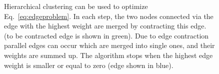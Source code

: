 \begin{center}
\begin{figure}
\begin{center}
{\begin{tikzpicture}
    \end{tikzpicture}


}
\caption{
    Hierarchical clustering can be used to optimize
    Eq.~\ref{eq:edgeproblem}.
    In each step, the two nodes connected via the edge with 
    the highest weight are merged by contracting this edge.
    (to be contracted edge is shown in green).
    Due to edge contraction parallel edges can occur which 
    are merged into single ones, and their weights are summed up.
    The algorithm stops when the highest edge weight is smaller
    or equal to zero (edge shown in blue).
}\label{fig:hc_alg}
\end{center}
\end{figure}
\end{center}



